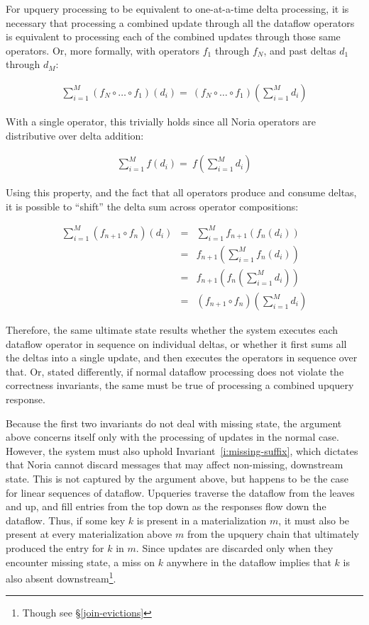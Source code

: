 For upquery processing to be equivalent to one-at-a-time delta processing, it is
necessary that processing a combined update through all the dataflow operators
is equivalent to processing each of the combined updates through those same
operators. Or, more formally, with operators $f_1$ through $f_N$, and past
deltas $d_1$ through $d_M$:

\begin{eqnarray*}
  \sum^M_{i=1}\left(f_N \circ \dots \circ f_1\right)\left(d_i\right) = \
  \left(f_N \circ \dots \circ f_1\right)\left(\sum^M_{i=1}d_i\right)
\end{eqnarray*}

With a single operator, this trivially holds since all Noria operators are
distributive over delta addition:

\begin{eqnarray*}
  \sum^M_{i=1}f\left(d_i\right) = \
  f\left(\sum^M_{i=1}d_i\right)
\end{eqnarray*}

Using this property, and the fact that all operators produce and consume deltas,
it is possible to ``shift'' the delta sum across operator compositions:

\begin{eqnarray*}
  \sum^M_{i=1}\left(f_{n+1} \circ f_n\right)\left(d_i\right) &=& \sum^M_{i=1}f_{n+1}\left(f_n\left(d_i\right)\right) \\
  &=& f_{n+1}\left(\sum^M_{i=1}f_n\left(d_i\right)\right) \\
  &=& f_{n+1}\left(f_n\left(\sum^M_{i=1}d_i\right)\right) \\
  &=& \left(f_{n+1} \circ f_n\right)\left(\sum^M_{i=1}d_i\right)
\end{eqnarray*}

Therefore, the same ultimate state results whether the system executes each
dataflow operator in sequence on individual deltas, or whether it first sums all
the deltas into a single update, and then executes the operators in sequence
over that. Or, stated differently, if normal dataflow processing does not
violate the correctness invariants, the same must be true of processing a
combined upquery response.

Because the first two invariants do not deal with missing state, the argument
above concerns itself only with the processing of updates in the normal case.
However, the system must also uphold Invariant~\ref{i:missing-suffix}, which
dictates that Noria cannot discard messages that may affect non-missing,
downstream state. This is not captured by the argument above, but happens to be
the case for linear sequences of dataflow. Upqueries traverse the dataflow from
the leaves and up, and fill entries from the top down as the responses flow down
the dataflow. Thus, if some key $k$ is present in a materialization $m$, it must
also be present at every materialization above $m$ from the upquery chain that
ultimately produced the entry for $k$ in $m$. Since updates are discarded only
when they encounter missing state, a miss on $k$ anywhere in the dataflow
implies that $k$ is also absent downstream\footnote{Though see
\S\ref{join-evictions}}.

